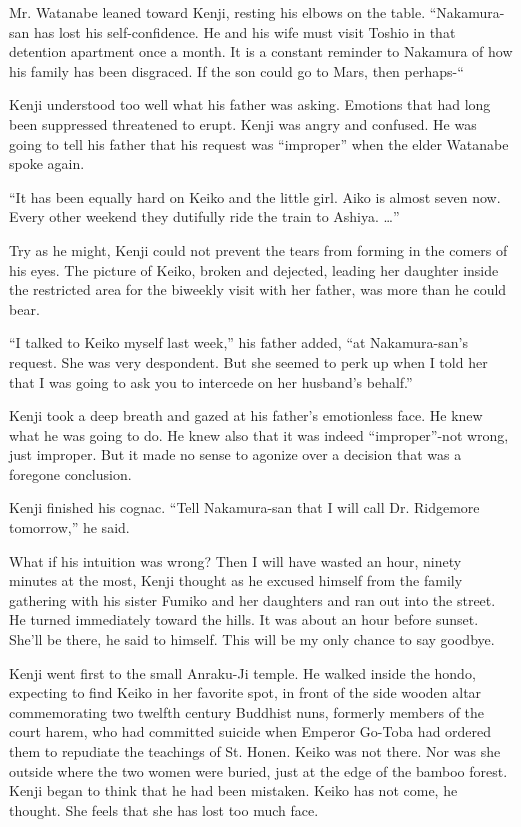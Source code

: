 \documentclass[]{article}
\begin{document}
{Mr. Watanabe leaned toward Kenji, resting his elbows on the table. “Nakamura-san has lost his self-confidence. He and his wife must visit Toshio in that detention apartment once a month. It is a constant reminder to Nakamura of how his family has been disgraced. If the son could go to Mars, then perhaps-“

Kenji understood too well what his father was asking. Emotions that had long been suppressed threatened to erupt. Kenji was angry and confused. He was going to tell his father that his request was “improper” when the elder Watanabe spoke again.

“It has been equally hard on Keiko and the little girl. Aiko is almost seven now. Every other weekend they dutifully ride the train to Ashiya. …”

Try as he might, Kenji could not prevent the tears from forming in the comers of his eyes. The picture of Keiko, broken and dejected, leading her daughter inside the restricted area for the biweekly visit with her father, was more than he could bear.

“I talked to Keiko myself last week,” his father added, “at Nakamura-san’s request. She was very despondent. But she seemed to perk up when I told her that I was going to ask you to intercede on her husband’s behalf.”

Kenji took a deep breath and gazed at his father’s emotionless face. He knew what he was going to do. He knew also that it was indeed “improper”-not wrong, just improper. But it made no sense to agonize over a decision that was a foregone conclusion.

Kenji finished his cognac. “Tell Nakamura-san that I will call Dr. Ridgemore tomorrow,” he said.

What if his intuition was wrong? Then I will have wasted an hour, ninety minutes at the most, Kenji thought as he excused himself from the family gathering with his sister Fumiko and her daughters and ran out into the street. He turned immediately toward the hills. It was about an hour before sunset. She’ll be there, he said to himself. This will be my only chance to say goodbye.

Kenji went first to the small Anraku-Ji temple. He walked inside the hondo, expecting to find Keiko in her favorite spot, in front of the side wooden altar commemorating two twelfth century Buddhist nuns, formerly members of the court harem, who had committed suicide when Emperor Go-Toba had ordered them to repudiate the teachings of St. Honen. Keiko was not there. Nor was she outside where the two women were buried, just at the edge of the bamboo forest. Kenji began to think that he had been mistaken. Keiko has not come, he thought. She feels that she has lost too much face.

}
\end{document}
